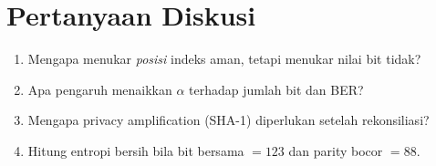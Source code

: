 \documentclass[11pt,a4paper]{article}
\begin{document}
\section{Pertanyaan Diskusi}
\begin{enumerate}[noitemsep]
  \item Mengapa menukar \emph{posisi} indeks aman, tetapi menukar nilai bit tidak?
  \item Apa pengaruh menaikkan $\alpha$ terhadap jumlah bit dan BER?
  \item Mengapa privacy amplification (SHA-1) diperlukan setelah rekonsiliasi?
  \item Hitung entropi bersih bila bit bersama $=123$ dan parity bocor $=88$.
\end{enumerate}
\end{document}
